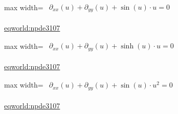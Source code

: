 \documentclass[UTF8,10pt,a4paper,fontset=mac]{ctexart}
\begin{document}
\begin{minipage}{\linewidth}\begin{center}\begin{adjustbox}{max width=\linewidth}$\displaystyle\begin{gathered}\begin{gathered}\partial_{xx}(u)+\partial_{yy}(u)+\sin(u)\cdot u=0\end{gathered}\end{gathered}$\end{adjustbox}\end{center}{\small\href{https://eqworld.ipmnet.ru/en/solutions/npde/npde3107.pdf}{eqworld:npde3107}}\par\end{minipage}\par\vspace{6mm}

\begin{minipage}{\linewidth}\begin{center}\begin{adjustbox}{max width=\linewidth}$\displaystyle\begin{gathered}\begin{gathered}\partial_{xx}(u)+\partial_{yy}(u)+\sinh(u)\cdot u=0\end{gathered}\end{gathered}$\end{adjustbox}\end{center}{\small\href{https://eqworld.ipmnet.ru/en/solutions/npde/npde3107.pdf}{eqworld:npde3107}}\par\end{minipage}\par\vspace{6mm}

\begin{minipage}{\linewidth}\begin{center}\begin{adjustbox}{max width=\linewidth}$\displaystyle\begin{gathered}\begin{gathered}\partial_{xx}(u)+\partial_{yy}(u)+\sin(u)\cdot u^{2}=0\end{gathered}\end{gathered}$\end{adjustbox}\end{center}{\small\href{https://eqworld.ipmnet.ru/en/solutions/npde/npde3107.pdf}{eqworld:npde3107}}\par\end{minipage}\par\vspace{6mm}
\end{document}
